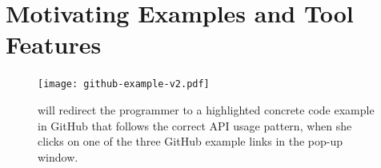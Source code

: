 \section{Motivating Examples and Tool Features}
\label{sec:motivation}
%

\begin{figure}
\centering
\texttt{[image: github-example-v2.pdf]}
  \vspace{.1in}
  \caption{{\tool} will redirect the programmer to a highlighted concrete code example in GitHub that follows the correct API usage pattern, when she clicks on one of the three GitHub example links in the pop-up window.\protect\footnotemark}
  \label{fig:github}
\end{figure}

